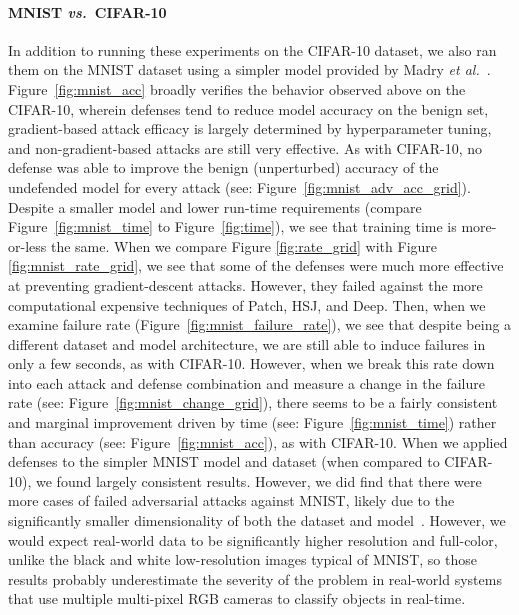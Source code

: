 \documentclass[journal]{IEEEtran}
\begin{document}
\paragraph{MNIST \textit{vs.}~CIFAR-10}
In addition to running these experiments on the CIFAR-10 dataset, we also ran them on the MNIST dataset using a simpler model provided by Madry \textit{et al.}~\cite{madry2017towards}. Figure~\ref{fig:mnist_acc} broadly verifies the behavior observed above on the CIFAR-10, wherein defenses tend to reduce model accuracy on the benign set, gradient-based attack efficacy is largely determined by hyperparameter tuning, and non-gradient-based attacks are still very effective. As with CIFAR-10, no defense was able to improve the benign (unperturbed) accuracy of the undefended model for every attack (see: Figure~\ref{fig:mnist_adv_acc_grid}). Despite a smaller model and lower run-time requirements (compare Figure~\ref{fig:mnist_time} to Figure~\ref{fig:time}), we see that training time is more-or-less the same. When we compare Figure \ref{fig:rate_grid} with Figure \ref{fig:mnist_rate_grid}, we see that some of the defenses were much more effective at preventing gradient-descent attacks. However, they failed against the more computational expensive techniques of Patch, HSJ, and Deep. Then, when we examine failure rate (Figure~\ref{fig:mnist_failure_rate}), we see that despite being a different dataset and model architecture, we are still able to induce failures in only a few seconds, as with CIFAR-10. However, when we break this rate down into each attack and defense combination and measure a change in the failure rate (see: Figure~\ref{fig:mnist_change_grid}), there seems to be a fairly consistent and marginal improvement driven by time (see: Figure~\ref{fig:mnist_time}) rather than accuracy (see:  Figure~\ref{fig:mnist_acc}), as with CIFAR-10. When we applied defenses to the simpler MNIST model and dataset (when compared to CIFAR-10), we found largely consistent results. However, we did find that there were more cases of failed adversarial attacks against MNIST, likely due to the significantly smaller dimensionality of both the dataset and model~\cite{dohmatob_generalized_2019}. However, we would expect real-world data to be significantly higher resolution and full-color, unlike the black and white low-resolution images typical of MNIST, so those results probably underestimate the severity of the problem in real-world systems that use multiple multi-pixel RGB cameras to classify objects in real-time. 
\end{document}
